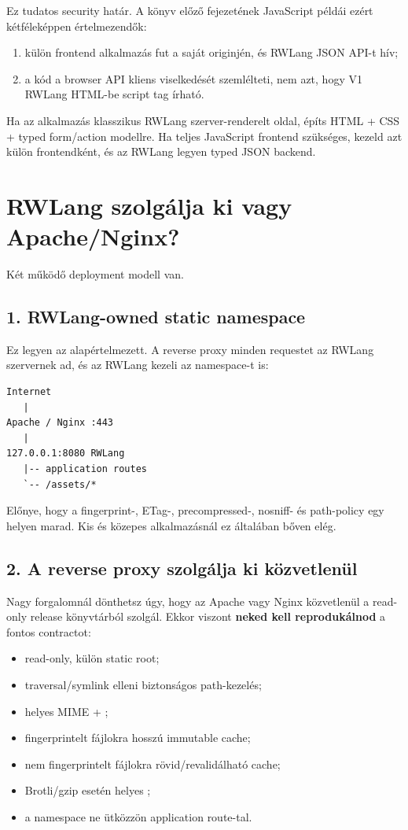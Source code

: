 Ez tudatos security határ. A könyv előző fejezetének JavaScript  példái ezért kétféleképpen értelmezendők:

\begin{enumerate}
  \item külön frontend alkalmazás fut a saját originjén, és RWLang JSON API-t hív;
  \item a kód a browser API kliens viselkedését szemlélteti, nem azt, hogy V1 RWLang HTML-be script tag írható.
\end{enumerate}

Ha az alkalmazás klasszikus RWLang szerver-renderelt oldal, építs HTML + CSS + typed form/action modellre. Ha teljes JavaScript frontend szükséges, kezeld azt külön frontendként, és az RWLang legyen typed JSON backend.

\section{RWLang szolgálja ki vagy Apache/Nginx?}

Két működő deployment modell van.

\subsection*{1. RWLang-owned static namespace}

Ez legyen az alapértelmezett. A reverse proxy minden requestet az RWLang szervernek ad, és az RWLang kezeli az  namespace-t is:

\begin{lstlisting}
Internet
   |
Apache / Nginx :443
   |
127.0.0.1:8080 RWLang
   |-- application routes
   `-- /assets/*
\end{lstlisting}

Előnye, hogy a fingerprint-, ETag-, precompressed-, nosniff- és path-policy egy helyen marad. Kis és közepes alkalmazásnál ez általában bőven elég.

\subsection*{2. A reverse proxy szolgálja ki közvetlenül}

Nagy forgalomnál dönthetsz úgy, hogy az Apache vagy Nginx közvetlenül a read-only release  könyvtárból szolgál. Ekkor viszont \textbf{neked kell reprodukálnod} a fontos contractot:

\begin{itemize}
  \item read-only, külön static root;
  \item traversal/symlink elleni biztonságos path-kezelés;
  \item helyes MIME + ;
  \item fingerprintelt fájlokra hosszú immutable cache;
  \item nem fingerprintelt fájlokra rövid/revalidálható cache;
  \item Brotli/gzip esetén helyes ;
  \item a namespace ne ütközzön application route-tal.
\end{itemize}

